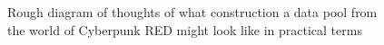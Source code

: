\begin{figure}
\centering
{}
\caption{Rough diagram of thoughts of what construction a data pool from
the world of Cyberpunk RED might look like in practical terms}
\end{figure}
